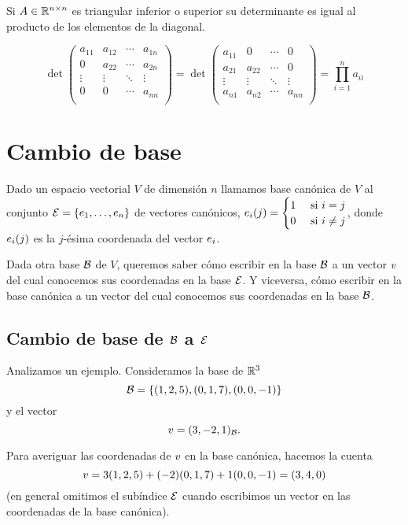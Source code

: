 Si $\Ab \in \R^{n \times n}$ es triangular inferior o superior su determinante es igual al producto de los elementos de la diagonal.

$$
\det\begin{pmatrix}a_{11}&a_{12}&\cdots & a_{1n} \\ 0 &a_{22}&\cdots & a_{2n}\\\vdots &\vdots &\ddots &\vdots \\0&0 & \cdots &a_{nn}\\\end{pmatrix} = \det\begin{pmatrix}a_{11}& 0&\cdots &0 \\ a_{21} &a_{22}&\cdots & 0\\\vdots &\vdots &\ddots &\vdots \\a_{n1}&a_{n2} & \cdots &a_{nn}\\\end{pmatrix} = \prod_{i=1}^n a_{ii}
$$




\section{Cambio de base}

Dado un espacio vectorial $V$ de dimensión $n$ llamamos base canónica de $V$ al conjunto $\E= \{\eb_1, \dots, \eb_n\}$ de vectores canónicos, $\eb_i(j) = \begin{cases} 1 & \text{ si } i = j \\ 0 & \text{ si } i \neq j \end{cases}$, donde $\eb_i(j)$ es la $j$-ésima coordenada del vector $\eb_i$.

Dada otra base $\mathcal B$ de $V$, queremos saber cómo escribir en la base $\mathcal B$ a un vector $\vb$ del cual conocemos sus coordenadas en la base $\mathcal E$. Y viceversa, cómo escribir en la base canónica a un vector del cual conocemos sus coordenadas en la base $\mathcal B$.

\subsection{Cambio de base de $\mathcal B$ a $\mathcal E$}

Analizamos un ejemplo. Consideramos la base de $\mathbb R^3$
$$\mathcal B= \{(1,2,5), (0, 1, 7), (0,0,-1)\}$$  y el vector
$$\vb = (3, -2, 1)_\B.$$

Para averiguar las coordenadas de $\vb$ en la base canónica, hacemos la cuenta
$$\vb = 3 (1,2,5) + (-2) (0, 1, 7) + 1 (0, 0, -1) = (3, 4, 0)$$
(en general omitimos el subíndice $\mathcal E$ cuando escribimos un vector en las coordenadas de la base canónica).

